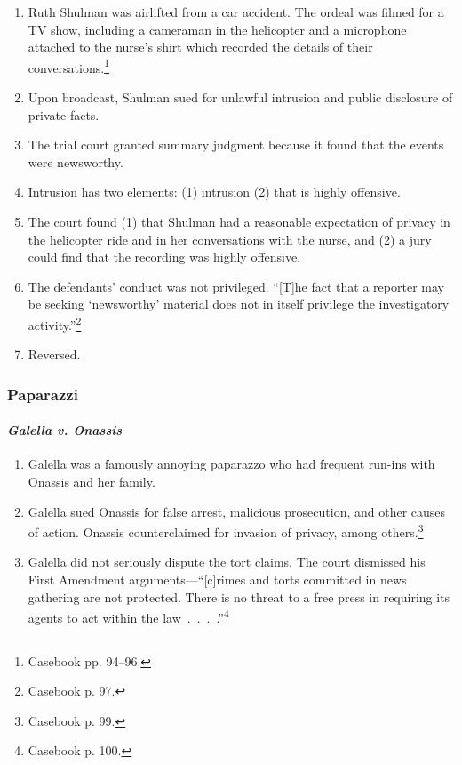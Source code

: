 \begin{enumerate}
    \item Ruth Shulman was airlifted from a car accident. The ordeal was filmed 
    for a TV show, including a cameraman in the helicopter and a microphone 
    attached to the nurse's shirt which recorded the details of their 
    conversations.\footnote{Casebook pp. 94--96.}
    \item Upon broadcast, Shulman sued for unlawful intrusion and public 
    disclosure of private facts.
    \item The trial court granted summary judgment because it found that the 
    events were newsworthy.
    \item Intrusion has two elements: (1) intrusion (2) that is highly 
    offensive.
    \item The court found (1) that Shulman had a reasonable expectation of 
    privacy in the helicopter ride and in her conversations with the nurse, and 
    (2) a jury could find that the recording was highly offensive.
    \item The defendants' conduct was not privileged. ``[T]he fact that a 
    reporter may be seeking `newsworthy' material does not in itself privilege 
    the investigatory activity.''\footnote{Casebook p. 97.}
    \item Reversed.
\end{enumerate}

\subsubsection{Paparazzi}

\paragraph{\emph{Galella v. Onassis}}

\begin{enumerate}
    \item Galella was a famously annoying paparazzo who had frequent run-ins 
    with Onassis and her family.
    \item Galella sued Onassis for false arrest, malicious prosecution, and 
    other causes of action. Onassis counterclaimed for invasion of privacy, 
    among others.\footnote{Casebook p. 99.}
    \item Galella did not seriously dispute the tort claims. The court dismissed 
    his First Amendment arguments---``[c]rimes and torts committed in news 
    gathering are not protected. There is no threat to a free press in requiring 
    its agents to act within the law~.~.~.~.''\footnote{Casebook p. 100.}
\end{enumerate}

